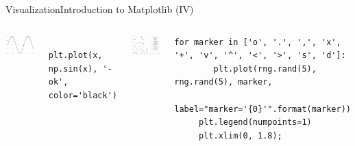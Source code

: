 \documentclass[10pt,compress]{beamer} %
\begin{document}
\begin{frame}[fragile]{Visualization}{Introduction to Matplotlib (IV)}
	\begin{columns}
	\includegraphics[width=\textwidth]{figs/matplotlib-sin.png}\\

	\begin{exampleblock}{}
	\vspace{-0.2cm} 
	\begin{lstlisting}
	plt.plot(x, np.sin(x), '-ok', color='black')
	\end{lstlisting}
	\vspace{-0.2cm} 
	\end{exampleblock}

	\centering \includegraphics[width=\textwidth]{figs/matplotlib-scatterplot.png}\\
	\begin{exampleblock}{}
	\vspace{-0.2cm} 
	\begin{lstlisting}[basicstyle=\tiny]
	for marker in ['o', '.', ',', 'x', '+', 'v', '^', '<', '>', 's', 'd']:
	    plt.plot(rng.rand(5), rng.rand(5), marker,
	         label="marker='{0}'".format(marker))
	 plt.legend(numpoints=1)
	 plt.xlim(0, 1.8);
	\end{lstlisting}
	\vspace{-0.2cm} 
	\end{exampleblock}
	\end{columns}
\end{frame}
\end{document}

